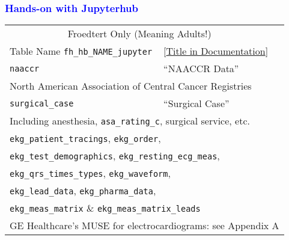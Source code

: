 \documentclass[11pt,pdftex,dvipsnames,usenames]{beamer}
\begin{document}
\begin{frame}[fragile]\frametitle{\bf\textcolor{blue}{Hands-on with Jupyterhub}}
\begin{tabular}{lll}
\multicolumn{2}{c}{Froedtert Only (Meaning Adults!)} \\
Table Name \texttt{fh\_hb\_NAME\_jupyter} & 
\textcolor{PineGreen}{[\href{https://ctri.mcw.edu/wp-content/uploads/CTSI-Honest-Broker-Data-Dictionary.pdf}{Title in Documentation}]} \\ \hline
\texttt{naaccr}       & ``NAACCR Data'' \\ 
\multicolumn{3}{l}{North American Association of Central Cancer Registries} \\ \hline 
\texttt{surgical\_case}       & ``Surgical Case'' \\ 
\multicolumn{3}{l}{Including anesthesia, \texttt{asa\_rating\_c}, surgical service, etc.} \\ \hline
\multicolumn{2}{l}{\texttt{ekg\_patient\_tracings}, \texttt{ekg\_order},} \\
\multicolumn{2}{l}{\texttt{ekg\_test\_demographics}, \texttt{ekg\_resting\_ecg\_meas},} \\
\multicolumn{2}{l}{\texttt{ekg\_qrs\_times\_types}, \texttt{ekg\_waveform},} \\
\multicolumn{2}{l}{\texttt{ekg\_lead\_data}, \texttt{ekg\_pharma\_data},} \\
\multicolumn{2}{l}{\texttt{ekg\_meas\_matrix} \& \texttt{ekg\_meas\_matrix\_leads}} \\
\multicolumn{3}{l}{GE Healthcare's MUSE for electrocardiograms: see Appendix A} \\ \hline
\end{tabular}

\end{frame}
\end{document}
